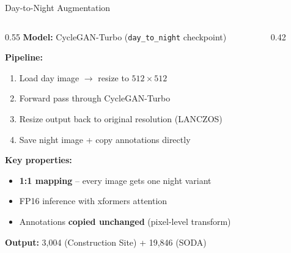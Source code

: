 \documentclass[aspectratio=169, 10pt]{beamer}
\begin{document}
\begin{frame}{Day-to-Night Augmentation}
\begin{columns}[T]
\begin{column}{0.55\textwidth}
\textbf{Model:} CycleGAN-Turbo (\texttt{day\_to\_night} checkpoint)

\vspace{0.5em}
\textbf{Pipeline:}
\begin{enumerate}
    \item Load day image $\rightarrow$ resize to $512 \times 512$
    \item Forward pass through CycleGAN-Turbo
    \item Resize output back to original resolution (LANCZOS)
    \item Save night image + copy annotations directly
\end{enumerate}

\vspace{0.5em}
\textbf{Key properties:}
\begin{itemize}
    \item \textbf{1:1 mapping} -- every image gets one night variant
    \item FP16 inference with xformers attention
    \item Annotations \textbf{copied unchanged} (pixel-level transform)
\end{itemize}

\vspace{0.5em}
\textbf{Output:} 3,004 (Construction Site) + 19,846 (SODA)
\end{column}
\begin{column}{0.42\textwidth}
\centering
{}
\end{column}
\end{columns}
\end{frame}
\end{document}
